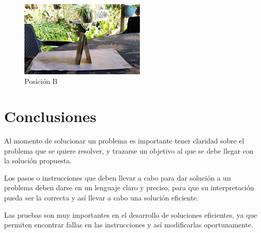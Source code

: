 ﻿\documentclass{article}
\begin{document}
\begin{figure}[h]
\includegraphics[width=6cm]{pos_b.png}
\centering
\caption{Posición B}
\label{fig:pos_b}
\end{figure}

\section{Conclusiones} \label{conclusiones}

Al momento de solucionar un problema es importante tener claridad sobre el problema que se quiere resolver,  y trazarse un objetivo al que se debe llegar con la solución propuesta.
\vspace{0.8cm}

Los pasos o instrucciones que deben llevar a cabo para dar solución a un problema deben darse en un lenguaje claro y preciso, para que su interpretación pueda ser la correcta y así llevar a cabo una solución eficiente.
\vspace{0.8cm}

Las pruebas son muy importantes en el desarrollo de soluciones eficientes, ya que permiten encontrar fallas en las instrucciones y así modificarlas oportunamente.
\end{document}
